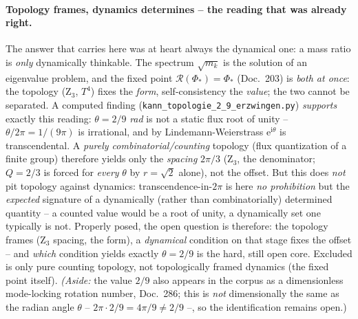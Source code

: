 \paragraph{Topology frames, dynamics determines -- the reading that was already right.} The answer that
carries here was at heart always the dynamical one: a mass ratio is \emph{only} dynamically thinkable.
The spectrum $\sqrt{m_k}$ is the solution of an eigenvalue problem, and the fixed point
$\mathcal R(\Phi_*)=\Phi_*$ (Doc.~203) is \emph{both at once}: the topology (Z$_3$, $T^4$) fixes the
\emph{form}, self-consistency the \emph{value}; the two cannot be separated. A computed finding
(\texttt{kann\_topologie\_2\_9\_erzwingen.py}) \emph{supports} exactly this reading: $\theta=2/9$
\emph{rad} is not a static flux root of unity -- $\theta/2\pi=1/(9\pi)$ is irrational, and by
Lindemann-Weierstrass $\mathrm e^{\mathrm i\theta}$ is transcendental. A \emph{purely
combinatorial/counting} topology (flux quantization of a finite group) therefore yields only the
\emph{spacing} $2\pi/3$ (Z$_3$, the denominator; $Q=2/3$ is forced for \emph{every} $\theta$ by
$r=\sqrt2$ alone), not the offset. But this does \emph{not} pit topology against dynamics:
transcendence-in-$2\pi$ is here \emph{no prohibition} but the \emph{expected} signature of a
dynamically (rather than combinatorially) determined quantity -- a counted value would be a root of
unity, a dynamically set one typically is not. Properly posed, the open question is therefore: the
topology frames (Z$_3$ spacing, the form), a \emph{dynamical} condition on that stage fixes the offset
-- and \emph{which} condition yields exactly $\theta=2/9$ is the hard, still open core. Excluded is only
pure counting topology, not topologically framed dynamics (the fixed point itself). \emph{(Aside:} the
value $2/9$ also appears in the corpus as a dimensionless mode-locking rotation number, Doc.~286; this
is \emph{not} dimensionally the same as the radian angle $\theta$ -- $2\pi\cdot2/9=4\pi/9\neq2/9$ --, so
the identification remains open.)

